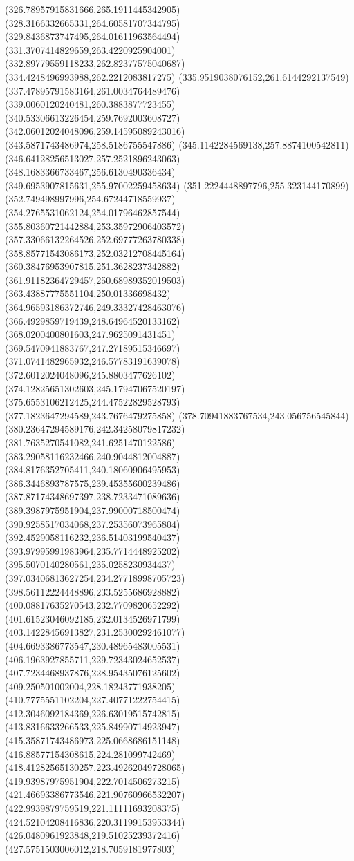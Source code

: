 {(326.78957915831666,265.1911445342905)
(328.3166332665331,264.60581707344795)
(329.8436873747495,264.01611963564494)
(331.3707414829659,263.4220925904001)
(332.89779559118233,262.82377575040687)
(334.4248496993988,262.2212083817275)
(335.9519038076152,261.6144292137549)
(337.47895791583164,261.0034764489476)
(339.0060120240481,260.3883877723455)
(340.53306613226454,259.7692003608727)
(342.06012024048096,259.14595089243016)
(343.5871743486974,258.5186755547886)
(345.1142284569138,257.8874100542811)
(346.64128256513027,257.2521896243063)
(348.1683366733467,256.6130490336434)
(349.6953907815631,255.97002259458634)
(351.2224448897796,255.323144170899)
(352.749498997996,254.67244718559937)
(354.2765531062124,254.01796462857544)
(355.80360721442884,253.35972906403572)
(357.33066132264526,252.69777263780338)
(358.85771543086173,252.03212708445164)
(360.38476953907815,251.3628237342882)
(361.91182364729457,250.68989352019503)
(363.43887775551104,250.01336698432)
(364.96593186372746,249.33327428463076)
(366.4929859719439,248.64964520133162)
(368.0200400801603,247.9625091431451)
(369.5470941883767,247.27189515346697)
(371.0741482965932,246.57783191639078)
(372.6012024048096,245.8803477626102)
(374.12825651302603,245.17947067520197)
(375.6553106212425,244.47522829528793)
(377.1823647294589,243.7676479275858)
(378.70941883767534,243.056756545844)
(380.23647294589176,242.34258079817232)
(381.7635270541082,241.6251470122586)
(383.29058116232466,240.9044812004887)
(384.8176352705411,240.18060906495953)
(386.3446893787575,239.45355600239486)
(387.87174348697397,238.7233471089636)
(389.3987975951904,237.99000718500474)
(390.9258517034068,237.25356073965804)
(392.4529058116232,236.51403199540437)
(393.97995991983964,235.7714448925202)
(395.5070140280561,235.0258230934437)
(397.03406813627254,234.27718998705723)
(398.56112224448896,233.5255686928882)
(400.08817635270543,232.7709820652292)
(401.61523046092185,232.0134526971799)
(403.14228456913827,231.25300292461077)
(404.6693386773547,230.48965483005531)
(406.1963927855711,229.72343024652537)
(407.7234468937876,228.95435076125602)
(409.250501002004,228.18243771938205)
(410.7775551102204,227.40771222754415)
(412.3046092184369,226.63019515742815)
(413.8316633266533,225.84990714923947)
(415.35871743486973,225.0668686151148)
(416.88577154308615,224.281099742469)
(418.41282565130257,223.49262049728065)
(419.93987975951904,222.7014506273215)
(421.46693386773546,221.90760966532207)
(422.9939879759519,221.11111693208375)
(424.52104208416836,220.31199153953344)
(426.0480961923848,219.51025239372416)
(427.5751503006012,218.7059181977803)
}
